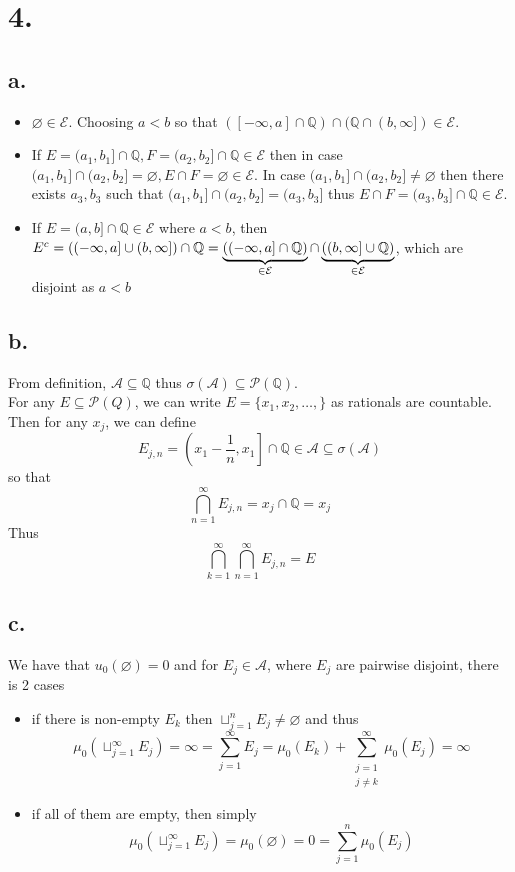 \documentclass[11pt]{article}
\theoremstyle{mystyle}
\theoremstyle{definition}
\begin{document}
\section*{4.}
\subsection*{a.}
\begin{itemize}
  \item $\varnothing \in \mathcal{E}$. Choosing $a< b$ so that $([-\infty , a] \cap \mathbb{Q}) \cap (\mathbb{Q} \cap (b, \infty]) \in \mathcal{E}$. 
  \item If $E = (a_1, b_1] \cap \mathbb{Q}, F = (a_2, b_2] \cap \mathbb{Q} \in \mathcal{E}$ then in case $(a_1, b_1] \cap (a_2, b_2] = \varnothing, E \cap F = \varnothing \in \mathcal{E}$. In case $(a_1, b_1] \cap (a_2, b_2] \ne \varnothing$ then there exists $a_3, b_3$ such that $(a_1, b_1] \cap (a_2, b_2] = (a_3, b_3]$ thus $E \cap F = (a_3, b_3] \cap \mathbb{Q} \in \mathcal{E}$.
  \item If $E = (a, b] \cap \mathbb{Q} \in \mathcal{E}$ where $a<b$, then $E^c = ((-\infty, a] \cup (b, \infty]) \cap \mathbb{Q}\\ = \underbrace{((-\infty, a] \cap \mathbb{Q})}_{\in \mathcal{E}} \cap \underbrace{((b, \infty] \cup \mathbb{Q})}_{\in \mathcal{E}}$, which are disjoint as $a<b$
\end{itemize}
\subsection*{b.}
From definition, $\mathcal{A} \subseteq \mathbb{Q}$ thus $\sigma(\mathcal{A}) \subseteq \mathcal{P}(\mathbb{Q})$. \\
For any $E \subseteq \mathcal{P}(Q)$, we can write $E = \{x_1, x_2, \hdots, \}$ as rationals are countable. Then for any $x_j$, we can define  
\[ 
  E_{j,n} = \left(x_1 - \displaystyle\frac{1}{n}, x_1 \right]\cap \mathbb{Q} \in \mathcal{A} \subseteq \sigma(\mathcal{A})
\]
so that 
\[
  \bigcap_{n=1}^\infty E_{j,n} = x_j \cap \mathbb{Q} = x_j 
\]
Thus 
\[
  \bigcap_{k=1}^\infty \bigcap_{n=1}^\infty E_{j,n} = E
\]
\subsection*{c.}
We have that $u_0(\varnothing) = 0$ and for $E_j \in \mathcal{A}$, where $E_j$ are pairwise disjoint, there is 2 cases
\begin{itemize}
  \item if there is non-empty $E_k$ then $\sqcup_{j=1}^n E_j \ne \varnothing$ and thus 
    \[
      \mu_0(\sqcup_{j=1}^\infty E_j ) = \infty = \sum_{j=1}^\infty E_j = \mu_0(E_k) + \sum_{\substack{j=1 \\ j \ne k}}^\infty \mu_0(E_j) = \infty 
    \]
  \item if all of them are empty, then simply
    \[
      \mu_0(\sqcup_{j=1}^\infty E_j) = \mu_0(\varnothing) = 0 = \sum_{j=1}^n \mu_0(E_j) 
    \]
\end{itemize}
\newpage
\end{document}
